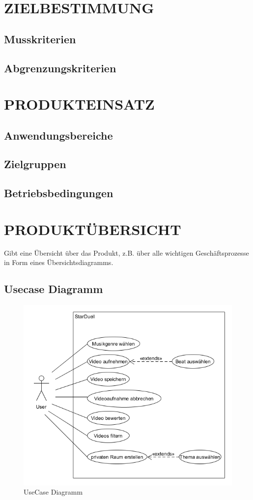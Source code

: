 \newpage
	\section{\Large ZIELBESTIMMUNG}
	
	\subsection{Musskriterien}
	
	\subsection{Abgrenzungskriterien}

	
	\section{\Large PRODUKTEINSATZ}
	\subsection{Anwendungsbereiche}
	
	\subsection{Zielgruppen}

	\subsection{Betriebsbedingungen}

	\section{\Large PRODUKTÜBERSICHT}
	Gibt eine Übersicht über das Produkt, z.B. über alle wichtigen Geschäftsprozesse in Form eines Übersichtsdiagramms.
	\subsection{Usecase Diagramm}
		\begin{figure}[H]
			\centering
			\includegraphics[width=0.7\linewidth]{images/UseCaseDiagramm}
			\caption{UseCase Diagramm}
			\label{fig:Usecase Diagramm}
		\end{figure}
		
